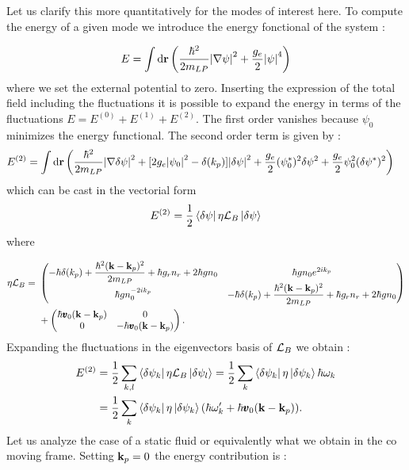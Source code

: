 Let us clarify this more quantitatively for the modes of interest here. To compute the energy of a given mode we introduce
the energy fonctional of the system \cite{castin_bose-einstein_2001}:

\begin{equation}
    \begin{aligned}
        E &= \int \mathrm{d}\mathbf{r} \left(\dfrac{\hbar^2}{2m_{LP}}\abs{\nabla\psi}^2 + \dfrac{g_e}{2}\abs{\psi}^4\right) \\
    \end{aligned}
\end{equation}
where we set the external potential to zero.
Inserting the expression of the total field including the fluctuations it is possible to expand the energy in terms of the fluctuations  
$E=E^{(0)}+E^{(1)}+E^{(2)}$. The first order vanishes because $\psi_0$ minimizes the energy functional. The second order term is given by :
\begin{equation}
    \begin{aligned}
        E^{(2)} &= \int \mathrm{d}\mathbf{r} \left(\dfrac{\hbar^2}{2m_{LP}}\abs{\nabla\delta\psi}^2 +[2g_e\abs{\psi_0}^2-\delta(k_p)]\abs{\delta\psi}^2+\dfrac{g_e}{2}(\psi_0^*)^2\delta\psi^2+ \dfrac{g_e}{2}\psi_0^2(\delta\psi^*)^2\right)
    \end{aligned}
\end{equation}
which can be cast in the vectorial form 
\begin{equation}
    E^{(2)} = \dfrac{1}{2}\bra{\delta\psi} \eta\mathcal{L}_B\ket{\delta\psi}
\end{equation}
 where 

\begin{equation}
    \begin{aligned}
    \eta\mathcal{L}_B = \ &
    \begin{pmatrix}
        -\hbar\delta(k_p)+\dfrac{\hbar^2(\mathbf{k}-\mathbf{k}_p)^2}{2m_{LP}}+\hbar g_rn_r + 2\hbar g n_0 &  \hbar g n_0e^{2ik_p} \\
        \hbar g n_0^{-2ik_p} & -\hbar\delta(k_p)+\dfrac{\hbar^2(\mathbf{k}-\mathbf{k}_p)^2}{2m_{LP}}+\hbar g_rn_r + 2\hbar g n_0
    \end{pmatrix}\\
    &+\begin{pmatrix}
        \hbar \pmb{v}_0(\mathbf{k}-\mathbf{k}_p) & 0 \\
        0 & -\hbar \pmb{v}_0(\mathbf{k}-\mathbf{k}_p)
    \end{pmatrix}.
    \end{aligned}
\end{equation}
Expanding the fluctuations in the eigenvectors basis of $\mathcal{L}_B$ we obtain :
\begin{equation}
    \begin{aligned}
    E^{(2)} &= \dfrac{1}{2}\sum_{k,l}\bra{\delta\psi_k}\eta\mathcal{L}_B\ket{\delta\psi_l}=\dfrac{1}{2}\sum_k\bra{\delta\psi_k}\eta\ket{\delta\psi_k}\hbar\omega_k \\
    &=\dfrac{1}{2}\sum_k\bra{\delta\psi_k}\eta\ket{\delta\psi_k}(\hbar\omega'_k+\hbar \pmb{v}_0(\mathbf{k}-\mathbf{k}_p)).
    \end{aligned}
    \label{eq:energy_bogo_lab_frame}
\end{equation}
Let us analyze the case of a static fluid or equivalently what we obtain in the co moving frame. Setting $\mathbf{k}_p=0$ the energy contribution is :

